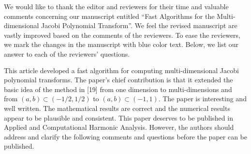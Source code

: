 \documentclass[11pt]{article}
\begin{document}
We would like to thank the editor and reviewers for their time and valuable comments concerning our manuscript entitled ``Fast Algorithms for the Multi-dimensional
Jacobi Polynomial Transform''. We feel the revised manuscript are vastly improved based on the comments of the reviewers. To ease the reviewers, we mark the changes in the manuscript with blue color text. Below, we list our answer to each of the reviewers' questions. 

\vspace{10pt}

 This article developed a fast algorithm for computing multi-dimensional Jacobi polynomial transforms. The paper’s chief contribution is that it extended the basic idea of
the method in [19] from one dimension to multi-dimensions and from $(a,b) \subset (-1/2,1/2)$
to $(a,b) \subset (-1,1)$.
The paper is interesting and well written. The mathematical results are correct and
the numerical results appear to be plausible and consistent. This paper deserves to be
published in Applied and Computational Harmonic Analysis.
However, the authors should address and clarify the following comments and questions
before the paper can be published.
\end{document}
